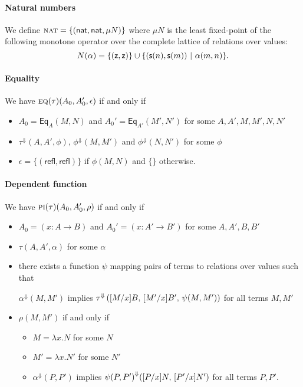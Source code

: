 \documentclass{article} \usepackage{chtt-notes} \usepackage{stmaryrd}
\newcommand{\lift}[1]{{#1}^{\Downarrow}}
\begin{document}
\paragraph{Natural numbers}
We define $ \textsc{nat} = \{(\mathsf{nat}, \mathsf{nat}, \mu N)\} $ where $\mu N$ is
the least fixed-point of the following monotone operator over the
complete lattice of relations over values:
\[ N(\alpha) = \{(\mathsf{z}, \mathsf{z})\} \cup \{ (\mathsf{s}(n), \mathsf{s}(m)) \ | \
  \alpha(m,n) \}. \]

\paragraph{Equality}
We have $\textsc{eq}(\tau)(A_0, A'_0, \epsilon)$ if and only if
\begin{itemize}
\item $A_0 = \textsf{Eq}_A(M, N)$ and
  $A_0' = \textsf{Eq}_{A'}(M', N')$ for some $A, A', M, M', N, N'$
\item $\lift{\tau}(A, A', \phi)$, $\lift{\phi}(M, M')$ and
  $\lift{\phi}(N, N')$ for some $\phi$
\item $\epsilon = \{(\textsf{refl}, \textsf{refl})\}$ if $\phi(M,N)$
  and $\{\}$ otherwise.
\end{itemize}

\paragraph{Dependent function}
We have $\textsc{pi}(\tau)(A_0, A'_0, \rho)$ if and only if
\begin{itemize}
\item $A_0 = (x:A \to B)$ and $A_0' = (x:A' \to B')$ for some
  $A,A',B,B'$
\item $\tau(A, A', \alpha)$ for some $\alpha$
\item there exists a function $\psi$ mapping pairs of terms to
  relations over values such that
  \begin{center}
    $\lift{\alpha}(M, M')$ implies
    $\lift{\tau}\left(\subst{M}{x}{B}, \, \subst{M'}{x}{B'}, \,
      \psi(M,M')\right)$ for all terms $M, M'$
  \end{center}
\item $\rho(M, M')$ if and only if
  \begin{itemize}
  \item $M = \lambda x. N$ for some $N$
  \item $M' = \lambda x. N'$ for some $N'$
  \item $\lift{\alpha}(P, P')$ implies
    $\lift{\psi(P, P')}(\subst{P}{x}{N}, \, \subst{P'}{x}{N'})$ for
    all terms $P, P'$.
  \end{itemize}
\end{itemize}
\end{document}
